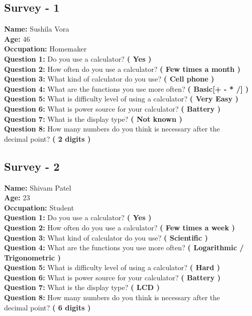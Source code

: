 \documentclass{article}
\begin{document}
\subsection{Survey - 1}
\textbf{Name: }Sushila Vora \\
\textbf{Age: } 46 \\
\textbf{Occupation: } Homemaker \\
\textbf{Question 1:} Do you use a calculator? \textbf{( Yes )}\\
\textbf{Question 2:} How often do you use a calculator? \textbf{( Few times a month )}\\
\textbf{Question 3:} What kind of calculator do you use? \textbf{( Cell phone )}\\
\textbf{Question 4:} What are the functions you use more often? \textbf{( Basic[+ - * /] )}\\
\textbf{Question 5:} What is difficulty level of using a calculator? \textbf{( Very Easy )}\\ 
\textbf{Question 6:} What is power source for your calculator? \textbf{(  Battery )}\\ 
\textbf{Question 7:} What is the display type? \textbf{( Not known )}\\
\textbf{Question 8:} How many numbers do you think is necessary after the \\decimal point? \textbf{( 2 digits )}
\newpage
\subsection{Survey - 2}
\textbf{Name: }Shivam Patel \\
\textbf{Age: } 23 \\
\textbf{Occupation: } Student \\
\textbf{Question 1:} Do you use a calculator? \textbf{( Yes )}\\
\textbf{Question 2:} How often do you use a calculator? \textbf{( Few times a week )}\\
\textbf{Question 3:} What kind of calculator do you use? \textbf{( Scientific )}\\
\textbf{Question 4:} What are the functions you use more often? \textbf{( Logarithmic / Trigonometric )}\\
\textbf{Question 5:} What is difficulty level of using a calculator? \textbf{( Hard )}\\ 
\textbf{Question 6:} What is power source for your calculator? \textbf{(  Battery )}\\ 
\textbf{Question 7:} What is the display type? \textbf{( LCD )}\\
\textbf{Question 8:} How many numbers do you think is necessary after the \\decimal point? \textbf{( 6 digits )}
\end{document}
